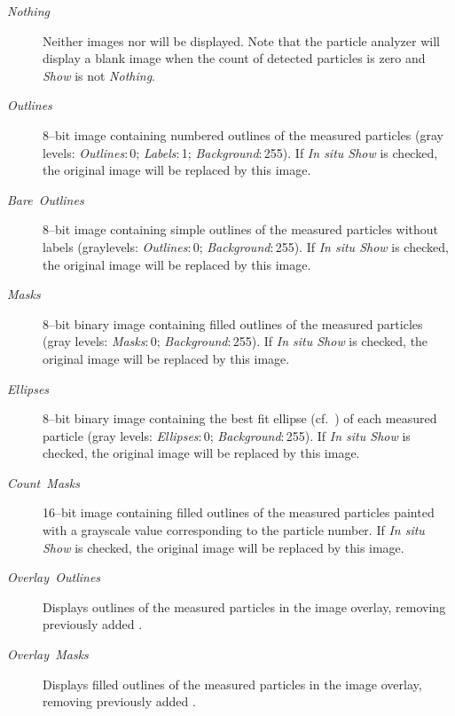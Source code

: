 \begin{description}
\begin{description}
\item [{\emph{Nothing}}] Neither images nor 
will be displayed. Note that the particle analyzer will display a
blank image when the count of detected particles is zero and \emph{Show}
is not \emph{Nothing}.
\item [{\emph{Outlines}}] 8--bit image containing numbered outlines of
the measured particles (gray levels: \emph{Outlines}:\,0; \emph{Labels}:\,1;
\emph{Background}:\,255). If \emph{In situ Show} is checked, the
original image will be replaced by this image.
\item [{\emph{Bare\ Outlines}}] 8--bit image containing simple outlines
of the measured particles without labels (graylevels: \emph{Outlines}:\,0;
\emph{Background}:\,255). If \emph{In situ Show} is checked, the
original image will be replaced by this image.
\item [{\emph{Masks}}] 8--bit binary image containing filled outlines of
the measured particles (gray levels: \emph{Masks}:\,0; \emph{Background}:\,255).
If \emph{In situ Show} is checked, the original image will be replaced
by this image.
\item [{\emph{Ellipses}}] 8--bit binary image containing the best fit ellipse
(cf.\ )
of each measured particle (gray levels: \emph{Ellipses}:\,0; \emph{Background}:\,255).
If \emph{In situ Show} is checked, the original image will be replaced
by this image.
\item [{\emph{Count\ Masks}}] 16--bit image containing filled outlines
of the measured particles painted with a grayscale value corresponding
to the particle number. If \emph{In situ Show} is checked, the original
image will be replaced by this image.
\item [{\emph{Overlay\ Outlines}}] Displays outlines of the measured particles
in the image overlay, removing previously added .
\item [{\emph{Overlay\ Masks}}] Displays filled outlines of the measured
particles in the image overlay, removing previously added .
\end{description}
\end{description}
